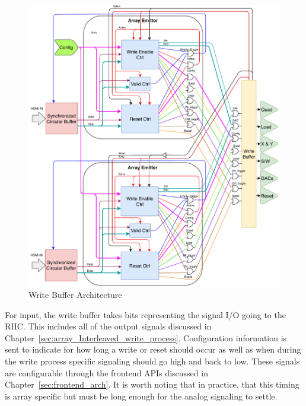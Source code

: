     \begin{figure}[H]
        \centering
        \includegraphics[width=1.0\textwidth]{fig/pdp_wb_arch.pdf}
        \caption{Write Buffer Architecture}
        \label{fig:wb_arch}
    \end{figure}

    For input, the write buffer takes bits representing the signal I/O going to the RIIC. This includes all of the output signals discussed in Chapter~\ref{sec:array_Interleaved_write_process}. Configuration information is sent to indicate for how long a write or reset should occur as well as when during the write process specific signaling should go high and back to low. These signals are configurable through the frontend APIs discussed in Chapter~\ref{sec:frontend_arch}. It is worth noting that in practice, that this timing is array specific but must be long enough for the analog signaling to settle.
